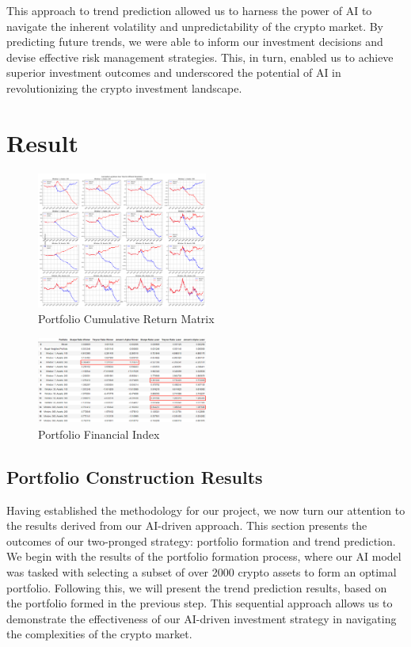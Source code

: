 \documentclass[journal]{IEEEtran}
\begin{document}
This approach to trend prediction allowed us to harness the power of AI to navigate the inherent volatility and unpredictability of the crypto market. By predicting future trends, we were able to inform our investment decisions and devise effective risk management strategies. This, in turn, enabled us to achieve superior investment outcomes and underscored the potential of AI in revolutionizing the crypto investment landscape.

\section{Result}
 
\begin{figure}[h]
\centering
\includegraphics[width=0.5\textwidth]{tex/images/portfolio_matrix.png}
\caption{Portfolio Cumulative Return Matrix}
\label{fig:p_matrix}
\end{figure}
 
\begin{figure}[h]
\centering
\includegraphics[width=0.5\textwidth]{tex/images/portfolio_index.png}
\caption{Portfolio Financial Index}
\label{fig:p_index}
\end{figure}
\subsection{Portfolio Construction Results}
 Having established the methodology for our project, we now turn our attention to the results derived from our AI-driven approach. This section presents the outcomes of our two-pronged strategy: portfolio formation and trend prediction. We begin with the results of the portfolio formation process, where our AI model was tasked with selecting a subset of over 2000 crypto assets to form an optimal portfolio. Following this, we will present the trend prediction results, based on the portfolio formed in the previous step. This sequential approach allows us to demonstrate the effectiveness of our AI-driven investment strategy in navigating the complexities of the crypto market. 
\end{document}
